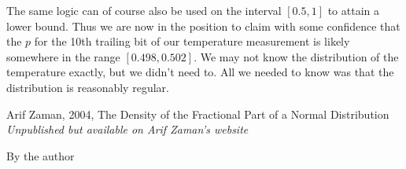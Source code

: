 \documentclass{article}
\theoremstyle{theorem}
\theoremstyle{definition}
\begin{document}
The same logic can of course also be used on the interval $[0.5,1]$ to attain a lower bound. Thus we are now in the position to claim with some confidence that the $p$ for the 10th trailing bit of our temperature measurement is likely somewhere in the range $[0.498,0.502]$. We may not know the distribution of the temperature exactly, but we didn't need to. All we needed to know was that the distribution is reasonably regular.

\begin{thebibliography}{1}
Arif Zaman, 2004, The Density of the Fractional Part of a Normal Distribution \textit{Unpublished but available on Arif Zaman's website}
	
By the author
\end{thebibliography}

\vfill\eject
\end{document}
